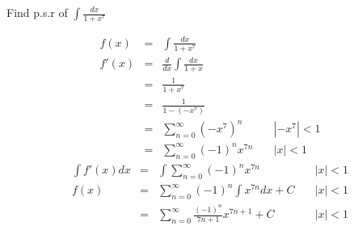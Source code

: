 \begin{eg}
Find p.s.r of \(\displaystyle \int \frac{dx}{1 + x^7}\)

\soln
\[\begin{array}{lcll}
\displaystyle f(x) & = & \displaystyle \int \frac{dx}{1 + x^7}\\
\displaystyle f'(x) & = & \displaystyle \frac{d}{dx} \int \frac{dx}{1 + x}\\
& = & \displaystyle \frac{1}{1 + x^7}\\
& = & \displaystyle \frac{1}{1 - (-x^7)}\\
& = & \displaystyle \sum^{\infty}_{n = 0} (-x^7)^n & \quad |-x^7| < 1\\
& = & \displaystyle \sum^{\infty}_{n = 0} (-1)^n x^{7n} & \quad |x| < 1
\end{array}\]
\[\begin{array}{lcll}
\displaystyle \int f'(x)dx & = & \displaystyle \int \sum^{\infty}_{n = 0} (-1)^n x^{7n} & \quad |x| < 1\\
f(x) & = & \displaystyle \sum^{\infty}_{n = 0} (-1)^n \int x^{7n} dx + C & \quad |x| < 1\\
& = & \displaystyle \sum^{\infty}_{n = 0} \frac{(-1)^n}{7n + 1} x^{7n + 1} + C & \quad |x| < 1
\end{array}\]
\end{eg}
